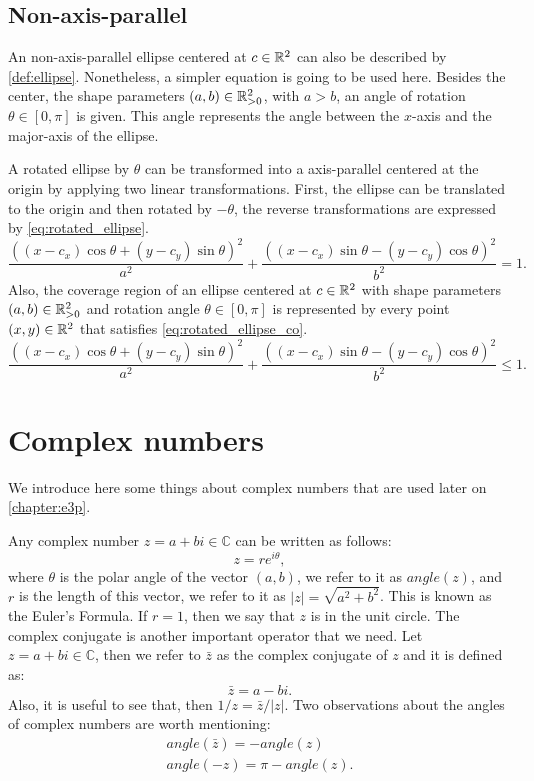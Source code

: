 \subsection{Non-axis-parallel}

An non-axis-parallel ellipse centered at $c\in\mathbb{R}^2$ can also be described by \autoref{def:ellipse}. Nonetheless, a simpler equation is going to be used here. Besides the center, the shape parameters $(a, b) \in \mathbb{R}^2_{>0}$, with $a > b$, an angle of rotation $\theta \in [0, \pi]$ is given. This angle represents the angle between the $x$-axis and the major-axis of the ellipse.

A rotated ellipse by $\theta$ can be transformed into a axis-parallel centered at the origin by applying two linear transformations. First, the ellipse can be translated to the origin and then rotated by $-\theta$, the reverse transformations are expressed by \autoref{eq:rotated_ellipse}.
\begin{equation}\label{eq:rotated_ellipse}
\dfrac{((x-c_x)\cos\theta + (y-c_y)\sin\theta)^2}{a^2}+\dfrac{((x-c_x)\sin\theta - (y-c_y)\cos\theta)^2}{b^2}=1.
\end{equation}
Also, the coverage region of an ellipse centered at $c\in\mathbb{R}^2$ with shape parameters $(a, b)\in\mathbb{R}^2_{>0}$ and rotation angle $\theta \in [0, \pi]$ is represented by every point $(x, y) \in \mathbb{R}^2$ that satisfies \autoref{eq:rotated_ellipse_co}.
\begin{equation}\label{eq:rotated_ellipse_co}
\dfrac{((x-c_x)\cos\theta + (y-c_y)\sin\theta)^2}{a^2}+\dfrac{((x-c_x)\sin\theta - (y-c_y)\cos\theta)^2}{b^2}\le 1.
\end{equation}

\section{Complex numbers}

We introduce here some things about complex numbers that are used later on \autoref{chapter:e3p}.

Any complex number $z = a + bi \in \mathbb{C}$ can be written as follows:
\begin{equation}
z = re^{i\theta},
\end{equation}
where $\theta$ is the polar angle of the vector $(a, b)$, we refer to it as $angle(z)$, and $r$ is the length of this vector, we refer to it as $|z| = \sqrt{a^2 + b^2}$. This is known as the Euler's Formula. If $r=1$, then we say that $z$ is in the unit circle. The complex conjugate is another important operator that we need. Let $z = a + bi \in \mathbb{C}$, then we refer to $\bar{z}$ as the complex conjugate of $z$ and it is defined as:
\begin{equation}
\bar{z} = a - bi.
\end{equation}
Also, it is useful to see that, then $1/z=\bar{z}/|z|$. Two observations about the angles of complex numbers are worth mentioning:
\begin{align}
angle(\bar{z}) = -angle(z)\\
angle(-z) = \pi - angle(z).
\end{align}



